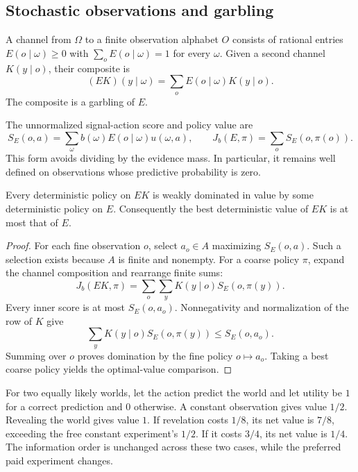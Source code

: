 \subsection{Stochastic observations and garbling}

\begin{definition}
A channel from $\Omega$ to a finite observation alphabet $O$ consists of rational entries $E(o\mid\omega)\ge0$ with $\sum_o E(o\mid\omega)=1$ for every $\omega$. Given a second channel $K(y\mid o)$, their composite is
\[
 (EK)(y\mid\omega)=\sum_o E(o\mid\omega)K(y\mid o).
\]
The composite is a garbling of $E$.
\end{definition}

The unnormalized signal-action score and policy value are
\[
 S_E(o,a)=\sum_\omega b(\omega)E(o\mid\omega)u(\omega,a),
 \qquad J_b(E,\pi)=\sum_o S_E(o,\pi(o)).
\]
This form avoids dividing by the evidence mass. In particular, it remains well defined on observations whose predictive probability is zero.

\begin{theorem}
Every deterministic policy on $EK$ is weakly dominated in value by some deterministic policy on $E$. Consequently the best deterministic value of $EK$ is at most that of $E$.
\end{theorem}
\begin{proof}
For each fine observation $o$, select $a_o\in A$ maximizing $S_E(o,a)$. Such a selection exists because $A$ is finite and nonempty. For a coarse policy $\pi$, expand the channel composition and rearrange finite sums:
\[
 J_b(EK,\pi)=\sum_o\sum_y K(y\mid o)S_E(o,\pi(y)).
\]
Every inner score is at most $S_E(o,a_o)$. Nonnegativity and normalization of the row of $K$ give
\[
 \sum_y K(y\mid o)S_E(o,\pi(y))\le S_E(o,a_o).
\]
Summing over $o$ proves domination by the fine policy $o\mapsto a_o$. Taking a best coarse policy yields the optimal-value comparison.
\end{proof}

\begin{example}
For two equally likely worlds, let the action predict the world and let utility be $1$ for a correct prediction and $0$ otherwise. A constant observation gives value $1/2$. Revealing the world gives value $1$. If revelation costs $1/8$, its net value is $7/8$, exceeding the free constant experiment's $1/2$. If it costs $3/4$, its net value is $1/4$. The information order is unchanged across these two cases, while the preferred paid experiment changes.
\end{example}

